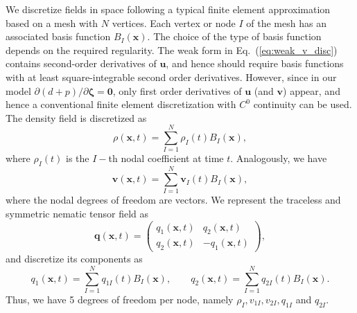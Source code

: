 \documentclass[12pt]{iopart}
\begin{document}
	
	We discretize fields in space following a typical finite element approximation based on a mesh with $N$ vertices. Each vertex or node $I$ of the mesh has an associated basis function $B_I(\bm{x})$. The choice of the type of basis function depends on the required regularity. The weak form in Eq.~(\ref{eq:weak_v_disc}) contains second-order derivatives of $\bm{u}$, and hence should require basis functions with at least square-integrable second order derivatives. However, since in our model $\partial ( d+ p) / \partial \bm{\zeta} = \bm{0}$, only first order derivatives of $\bm{u}$ (and $\bm{v}$) appear, and hence a conventional finite element discretization with $C^0$ continuity can be used. The density field is discretized as
	\begin{equation}
		\rho(\bm{x},t) = \sum_{I=1}^N \rho_I(t) B_I(\bm{x}), \label{eq:shape_func}
	\end{equation}
	where $\rho_I(t)$ is the $I-$th nodal coefficient at time $t$. Analogously, we have 
	\begin{equation}
		\bm{v}(\bm{x},t) = \sum_{I=1}^N\bm{v}_I(t) B_I(\bm{x}),
	\end{equation}
	where the nodal degrees of freedom are vectors. 
	We represent the traceless and symmetric nematic tensor field as
	\begin{equation}
		\bm{q}(\bm{x},t) = \left(\begin{array}{cc}
			q_1(\bm{x},t) & q_2(\bm{x},t)\\
			q_2(\bm{x},t) & -q_1(\bm{x},t)
		\end{array}\right),
	\end{equation}
	and discretize its components as
	\begin{equation}
		q_1(\bm{x},t) = \sum_{I=1}^N q_{1I} (t) B_I(\bm{x}), \qquad  q_2(\bm{x},t) = \sum_{I=1}^N q_{2I} (t) B_I(\bm{x}).
	\end{equation}
	Thus, we have 5 degrees of freedom per node, namely $\rho_I, v_{1I}, v_{2I}, q_{1I}$ and $q_{2I}$.
	
\end{document}
